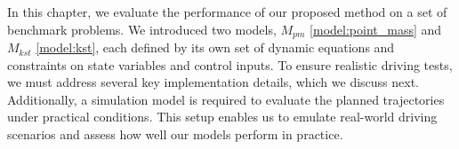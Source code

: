 In this chapter, we evaluate the performance of our proposed method on a set of benchmark problems.
We introduced two models, $M_{pm}$ \eqref{model:point_mass} and $M_{kst}$ \eqref{model:kst}, each defined by its own set of dynamic equations and
constraints on state variables and control inputs.
To ensure realistic driving tests, we must address several key implementation details, which we discuss next.
Additionally, a simulation model is required to evaluate the planned trajectories under practical conditions.
This setup enables us to emulate real-world driving scenarios and assess how well our models perform in practice.
